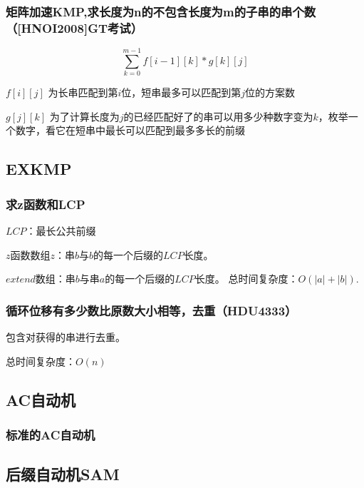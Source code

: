 \documentclass{article}
\begin{document}
\subsubsection{矩阵加速KMP,求长度为n的不包含长度为m的子串的串个数（[HNOI2008]GT考试）}
$$\sum_{k=0}^{m-1}f[i-1][k]\ast g[k][j]$$\par
$f[i][j]$ 为长串匹配到第$i$位，短串最多可以匹配到第$j$位的方案数\par
$g[j][k]$ 为了计算长度为$j$的已经匹配好了的串可以用多少种数字变为$k$，枚举一个数字，看它在短串中最长可以匹配到最多多长的前缀\par


\subsection{EXKMP}
\subsubsection{求z函数和LCP}
$LCP$：最长公共前缀\par
$z$函数数组$z$：串$b$与$b$的每一个后缀的$LCP$长度。\par
$extend$数组：串$b$与串$a$的每一个后缀的$LCP$长度。
总时间复杂度：$O(|a|+|b|)$.

\subsubsection{循环位移有多少数比原数大小相等，去重（HDU4333）}
包含对获得的串进行去重。\par
总时间复杂度：$O(n)$



\subsection{AC自动机}
\subsubsection{标准的AC自动机}


\subsection{后缀自动机SAM}
\end{document}
